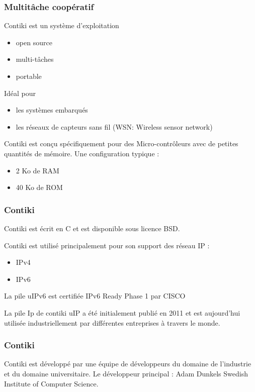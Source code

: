 \documentclass{smilebeamer}
\begin{document}
\begin{frame}
\frametitle{Multitâche coopératif}

Contiki est un système d'exploitation
\begin{itemize}
\item open source 
\item multi-tâches
\item portable
\end{itemize}

Idéal pour 
\begin{itemize}
\item les systèmes embarqués 
\item les réseaux de capteurs sans fil (WSN: Wireless sensor network) 
 \end{itemize}
 
Contiki est conçu spécifiquement pour des Micro-contrôleurs avec de petites quantités de mémoire. 
Une configuration typique :
\begin{itemize}
\item 2 Ko de RAM 
\item 40 Ko de ROM
 \end{itemize}
\end{frame}





\begin{frame}
\frametitle{Contiki}

Contiki est écrit en C et est disponible sous licence BSD.

Contiki est utilisé principalement pour son support des réseau IP :
\begin{itemize}
\item IPv4
\item IPv6
\end{itemize}

La pile uIPv6 est certifiée IPv6 Ready Phase 1 par CISCO

La pile Ip de contiki uIP a été initialement publié en 2011 et est aujourd'hui utilisée industriellement par différentes entreprises à travers le monde.

\end{frame}


\begin{frame}
\frametitle{Contiki}
Contiki est développé par une équipe de développeurs du domaine de l'industrie et du domaine universitaire. 
Le développeur principal :
Adam Dunkels
Swedish Institute of Computer Science.
\end{frame}
\end{document}
